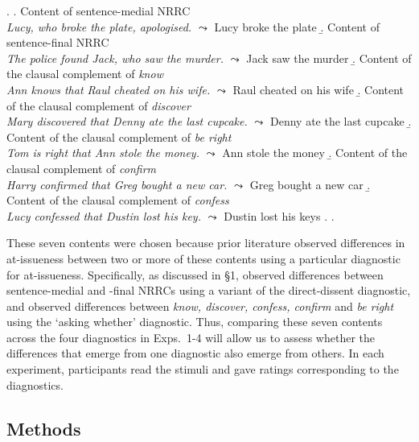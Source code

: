 \documentclass[times,linguex,xcolor]{glossa}
\begin{document}
    \ex.\label{stims}
    \a.\label{stims.a} Content of sentence-medial NRRC \\
      \emph{Lucy, who broke the plate, apologised.} $\leadsto$ Lucy broke the plate
    \b.\label{stims.b} Content of sentence-final NRRC \\
    \emph{The police found Jack, who saw the murder.} $\leadsto$ Jack saw the murder
    \b.\label{stims.c} Content of the clausal complement of \emph{know} \\
    \emph{Ann knows that Raul cheated on his wife.} $\leadsto$ Raul cheated on his wife
    \b.\label{stims.d} Content of the clausal complement of \emph{discover} \\
    \emph{Mary discovered that Denny ate the last cupcake.} $\leadsto$ Denny ate the last cupcake
    \b.\label{stims.e} Content of the clausal complement of \emph{be right} \\
    \emph{Tom is right that Ann stole the money.} $\leadsto$ Ann stole the money
    \b.\label{stims.f} Content of the clausal complement of \emph{confirm} \\
    \emph{Harry confirmed that Greg bought a new car.} $\leadsto$ Greg bought a new car
    \b.\label{stims.g} Content of the clausal complement of \emph{confess}  \\
    \emph{Lucy confessed that Dustin lost his key.} $\leadsto$ Dustin lost his keys
    \z.
    \z.

    These seven contents were chosen because prior literature observed differences in at-issueness between two or more of these contents using a particular diagnostic for at-issueness.  Specifically, as discussed in \S1, \citealt{syrett_experimental_2015} observed differences between sentence-medial and -final NRRCs using a variant of the direct-dissent diagnostic,
    and \citealt{degen-tonhauser-glossa} observed differences between \emph{know, discover, confess, confirm} and \emph{be right} using the `asking whether' diagnostic. Thus, comparing these seven contents across the four diagnostics in Exps.~1-4 will allow us to assess whether the differences that emerge from one diagnostic also emerge from others. In each experiment, participants read the stimuli and gave ratings corresponding to the diagnostics.

  \subsection{Methods}
    
\end{document}
